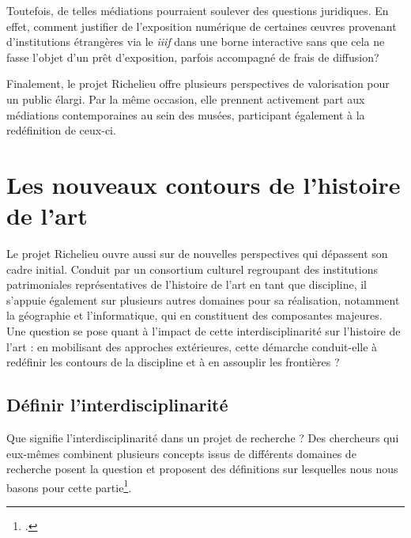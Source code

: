 Toutefois, de telles médiations pourraient soulever des questions juridiques. En effet, comment justifier de l'exposition numérique de certaines œuvres provenant d'institutions étrangères via le \textit{\acrshort{iiif}} dans une borne interactive sans que cela ne fasse l'objet d'un prêt d'exposition, parfois accompagné de frais de diffusion?  

Finalement, le projet Richelieu offre plusieurs perspectives de valorisation pour un public élargi. Par la même occasion, elle prennent activement part aux médiations contemporaines au sein des musées, participant également à la redéfinition de ceux-ci.

\section{Les nouveaux contours de l'histoire de l'art}
Le projet Richelieu ouvre aussi sur de nouvelles perspectives qui dépassent son cadre initial. Conduit par un consortium culturel regroupant des institutions patrimoniales représentatives de l'histoire de l'art en tant que discipline, il s'appuie également sur plusieurs autres domaines pour sa réalisation, notamment la géographie et l'informatique, qui en constituent des composantes majeures. Une question se pose quant à l'impact de cette interdisciplinarité sur l'histoire de l'art : en mobilisant des approches extérieures, cette démarche conduit-elle à redéfinir les contours de la discipline et à en assouplir les frontières ?

\subsection{Définir l'interdisciplinarité}
Que signifie l'interdisciplinarité dans un projet de recherche ? Des chercheurs qui eux-mêmes combinent plusieurs concepts issus de différents domaines de recherche posent la question et proposent des définitions sur lesquelles nous nous basons pour cette partie\footcite{STEMBERAdvancing1991, JENSENIUSSound2022}. 

